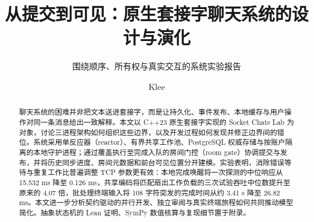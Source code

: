 \documentclass[sigconf,nonacm]{acmart}
\title{从提交到可见：原生套接字聊天系统的设计与演化}
\subtitle{围绕顺序、所有权与真实交互的系统实验报告}
\author{Klee}
\affiliation{\institution{Socket Chats Lab}\country{}}
\newcommand{\sys}{Socket Chats Lab}
\begin{document}
\begin{abstract}
聊天系统的困难并非把文本送进套接字，而是让持久化、事件发布、本地缓存与用户操作对同一条消息给出一致解释。本文以 C++23 原生套接字实现的 \sys{} 为对象，讨论三进程架构如何组织这些边界，以及开发过程如何发现并修正边界间的错位。系统采用单反应器（reactor）、有界共享工作池、PostgreSQL 权威存储与按账户隔离的本地守护进程；通过覆盖执行至完成入队的房间门控（room gate）协调提交与发布，并将历史同步进度、房间元数据和前台可见位置分开建模。实验表明，消除错误等待与重复工作比普遍调整 TCP 参数更有效：本地完成唤醒将一次探测的中位响应从 15.532 ms 降至 0.126 ms，共享编码将匹配扇出工作负载的三次试验吞吐中位数提升至原来的 4.07 倍，批处理终端输入将 108 字符突发的完成时间从约 3.41 s 降至 26.82 ms。本文进一步分析契约驱动的并行开发、独立审阅与真实终端旅程如何共同推动模型简化。抽象状态机的 Lean 证明、SymPy 数值核算与复现细节置于附录。
\end{abstract}
\maketitle








\clearpage
\appendix


\end{document}
